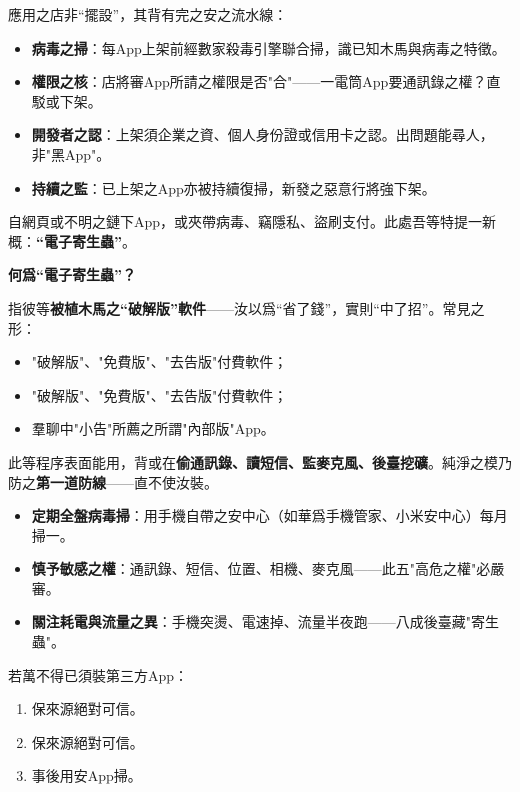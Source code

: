 
應用之店非“擺設”，其背有完之安之流水線：

\begin{itemize}
  \item \textbf{病毒之掃}：每App上架前經數家殺毒引擎聯合掃，識已知木馬與病毒之特徵。
  \item \textbf{權限之核}：店將審App所請之權限是否"合"——一電筒App要通訊錄之權？直駁或下架。
  \item \textbf{開發者之認}：上架須企業之資、個人身份證或信用卡之認。出問題能尋人，非"黑App"。
  \item \textbf{持續之監}：已上架之App亦被持續復掃，新發之惡意行將強下架。
\end{itemize}


自網頁或不明之鏈下App，或夾帶病毒、竊隱私、盜刷支付。此處吾等特提一新概：\textbf{“電子寄生蟲”}。

\textbf{何爲“電子寄生蟲”？}\par

指彼等\textbf{被植木馬之“破解版”軟件}——汝以爲“省了錢”，實則“中了招”。常見之形：

\begin{itemize}
  \item "破解版"、"免費版"、"去告版"付費軟件；
  \item "破解版"、"免費版"、"去告版"付費軟件；
  \item 羣聊中"小告"所薦之所謂"內部版"App。
\end{itemize}

此等程序表面能用，背或在\textbf{偷通訊錄、讀短信、監麥克風、後臺挖礦}。純淨之模乃防之\textbf{第一道防線}——直不使汝裝。


\begin{itemize}
  \item \textbf{定期全盤病毒掃}：用手機自帶之安中心（如華爲手機管家、小米安中心）每月掃一。
  \item \textbf{慎予敏感之權}：通訊錄、短信、位置、相機、麥克風——此五"高危之權"必嚴審。
  \item \textbf{關注耗電與流量之異}：手機突燙、電速掉、流量半夜跑——八成後臺藏"寄生蟲"。
\end{itemize}

若萬不得已須裝第三方App：

\begin{enumerate}
  \item 保來源絕對可信。
  \item 保來源絕對可信。
  \item 事後用安App掃。
\end{enumerate}

